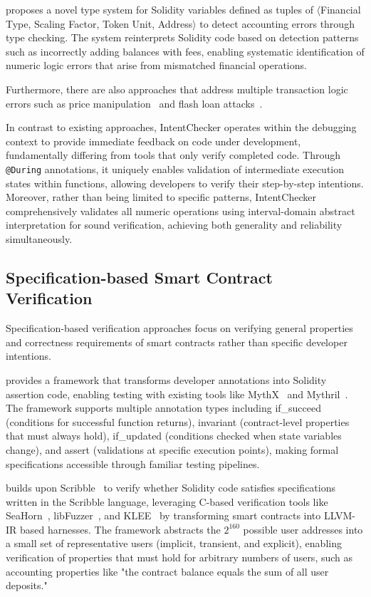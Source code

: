 \documentclass[pdflatex,sn-basic]{sn-jnl}%
\theoremstyle{thmstyleone}%
\theoremstyle{thmstyletwo}%
\theoremstyle{thmstylethree}%
\begin{document}
\citep{accountingerrors} proposes a novel type system for Solidity variables defined as tuples of $\langle$Financial Type, Scaling Factor, Token Unit, Address$\rangle$
to detect accounting errors through type checking.
The system reinterprets Solidity code based on detection patterns such as incorrectly adding balances with fees,
enabling systematic identification of numeric logic errors that arise from mismatched financial operations.

Furthermore, there are also approaches that address multiple transaction logic errors such as price manipulation~\citep{defiranger,defiguard,pomabuster,secplf,defitainter}
and flash loan attacks~\citep{defitail,midnight}.

In contrast to existing approaches, IntentChecker operates within the debugging context to provide immediate feedback on code under development,
fundamentally differing from tools that only verify completed code.
Through \texttt{@During} annotations, it uniquely enables validation of intermediate execution states within functions,
allowing developers to verify their step-by-step intentions.
Moreover, rather than being limited to specific patterns, IntentChecker comprehensively validates all numeric operations
using interval-domain abstract interpretation for sound verification, achieving both generality and reliability simultaneously.

\subsection{Specification-based Smart Contract Verification}
Specification-based verification approaches focus on verifying general properties and correctness requirements of smart contracts rather than specific developer intentions.

\citep{scribble} provides a framework that transforms developer annotations into Solidity assertion code,
enabling testing with existing tools like MythX~\citep{mythx} and Mythril~\citep{mythril}.
The framework supports multiple annotation types including if\_succeed (conditions for successful function returns),
invariant (contract-level properties that must always hold), if\_updated (conditions checked when state variables change),
and assert (validations at specific execution points), making formal specifications accessible through familiar testing pipelines.

\citep{smartace} builds upon Scribble~\citep{scribble} to verify whether Solidity code satisfies specifications written in the Scribble language,
leveraging C-based verification tools like SeaHorn~\citep{seahorn}, libFuzzer~\citep{libfuzzer}, and KLEE~\citep{klee} by transforming smart contracts into LLVM-IR based harnesses.
The framework abstracts the $2^{160}$ possible user addresses into a small set of representative users (implicit, transient, and explicit),
enabling verification of properties that must hold for arbitrary numbers of users, such as accounting properties like
"the contract balance equals the sum of all user deposits."
\end{document}
